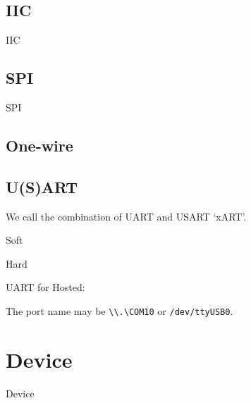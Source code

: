 \subsection{IIC}



{IIC}



\subsection{SPI}



{SPI}



\subsection{One-wire}





\subsection{U(S)ART}



We call the combination of UART and USART `xART'. 

Soft

Hard

UART for Hosted:

The port name may be \verb|\\.\COM10| or \verb|/dev/ttyUSB0|.



\section{Device}

{Device}

